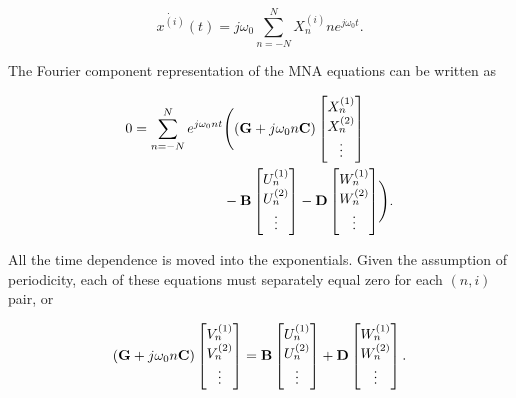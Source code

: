 \documentclass[12pt,journal,compsoc]{../ieeepaper/IEEEtran}
\begin{document}
\begin{equation}\label{eqn:ece1254projectReport:520}
\dot{x^{(i)}}(t) = j \omega_0 \sum_{n=-N}^N X_n^{(i)} n e^{j \omega_0 t}.
\end{equation}

The Fourier component representation of the MNA equations can be written as

\begin{equation}\label{eqn:ece1254projectReport:600}
\begin{aligned}
0 = \sum_{n = -N}^N e^{j \omega_0 n t}
&\Biglr{
   \lr{ \BG + j \omega_0 n \BC } 
\begin{bmatrix}
X_n^{(1)} \\
X_n^{(2)} \\
\vdots \\
\end{bmatrix} \\
   &- \BB 
\begin{bmatrix}
U_n^{(1)} \\
U_n^{(2)} \\
\vdots \\
\end{bmatrix}
   - \BD 
\begin{bmatrix}
W_n^{(1)} \\
W_n^{(2)} \\
\vdots \\
\end{bmatrix}
}.
\end{aligned}
\end{equation}

All the time dependence is moved into the exponentials.  
Given the 
assumption of periodicity, each of these equations must separately equal zero for each \( ( n, i ) \) pair, or

\begin{dmath}\label{eqn:ece1254projectReport:540}
\lr{
\BG + j \omega_0 n \BC
}
\begin{bmatrix}
V_n^{(1)} \\
V_n^{(2)} \\
\vdots \\
\end{bmatrix}
=
\BB
\begin{bmatrix}
U_n^{(1)} \\
U_n^{(2)} \\
\vdots \\
\end{bmatrix}
+\BD
\begin{bmatrix}
W_n^{(1)} \\
W_n^{(2)} \\
\vdots \\
\end{bmatrix}.
\end{dmath}
\end{document}
